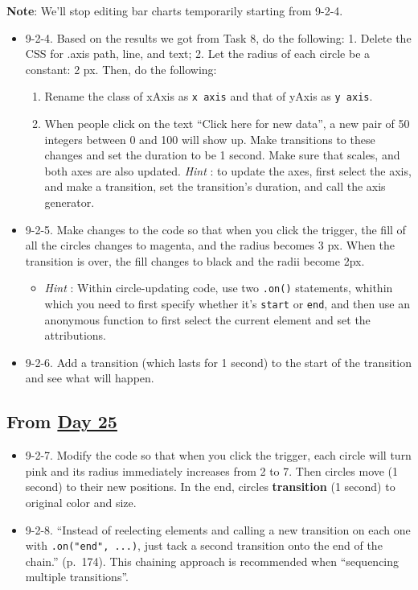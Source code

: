 \documentclass[
]{book}
\providecommand{\tightlist}{%
  \setlength{\itemsep}{0pt}\setlength{\parskip}{0pt}}
\begin{document}
\textbf{Note}: We'll stop editing bar charts temporarily starting from 9-2-4.

\begin{itemize}
\item
  9-2-4. Based on the results we got from Task 8, do the following: 1. Delete the CSS for .axis path, line, and text; 2. Let the radius of each circle be a constant: 2 px. Then, do the following:

  \begin{enumerate}
  \def\labelenumi{\arabic{enumi}.}
  \item
    Rename the class of xAxis as \texttt{x\ axis} and that of yAxis as \texttt{y\ axis}.
  \item
    When people click on the text ``Click here for new data'', a new pair of 50 integers between 0 and 100 will show up. Make transitions to these changes and set the duration to be 1 second. Make sure that scales, and both axes are also updated. \emph{Hint} : to update the axes, first select the axis, and make a transition, set the transition's duration, and call the axis generator.
  \end{enumerate}
\item
  9-2-5. Make changes to the code so that when you click the trigger, the fill of all the circles changes to magenta, and the radius becomes 3 px. When the transition is over, the fill changes to black and the radii become 2px.

  \begin{itemize}
  \tightlist
  \item
    \emph{Hint} : Within circle-updating code, use two \texttt{.on()} statements, whithin which you need to first specify whether it's \texttt{start} or \texttt{end}, and then use an anonymous function to first select the current element and set the attributions.
  \end{itemize}
\item
  9-2-6. Add a transition (which lasts for 1 second) to the start of the transition and see what will happen.
\end{itemize}

\hypertarget{from-day-25}{%
\subsection{\texorpdfstring{From \href{https://observablehq.com/@hongtaoh/day-twenty-five-2020-09-18}{Day 25}}{From Day 25}}\label{from-day-25}}

\begin{itemize}
\item
  9-2-7. Modify the code so that when you click the trigger, each circle will turn pink and its radius immediately increases from 2 to 7. Then circles move (1 second) to their new positions. In the end, circles \textbf{transition} (1 second) to original color and size.
\item
  9-2-8. ``Instead of reelecting elements and calling a new transition on each one with \texttt{.on("end",\ ...)}, just tack a second transition onto the end of the chain.'' (p.~174). This chaining approach is recommended when ``sequencing multiple transitions''.
\end{itemize}
\end{document}
